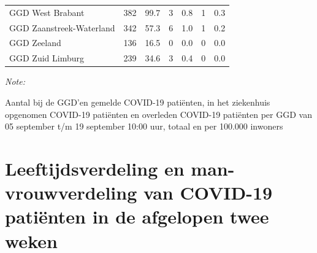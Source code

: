 \documentclass[
  english,
  man,floatsintext]{apa6}
\begin{document}
\begin{table}[H]
\begin{threeparttable}
\begin{tabular}{lrrrrrr}
GGD West Brabant & 382 & 99.7 & 3 & 0.8 & 1 & 0.3\\
GGD Zaanstreek-Waterland & 342 & 57.3 & 6 & 1.0 & 1 & 0.2\\
GGD Zeeland & 136 & 16.5 & 0 & 0.0 & 0 & 0.0\\
GGD Zuid Limburg & 239 & 34.6 & 3 & 0.4 & 0 & 0.0\\
\bottomrule
\end{tabular}
\begin{tablenotes}
\item \textit{Note: } 
\item Aantal bij de GGD’en gemelde COVID-19 patiënten, in het ziekenhuis opgenomen COVID-19 patiënten en overleden COVID-19 patiënten per GGD van 05 september t/m 19 september 10:00 uur, totaal en per 100.000 inwoners
\end{tablenotes}
\end{threeparttable}
\endgroup{}
\end{table}

\newpage

\hypertarget{leeftijdsverdeling-en-man-vrouwverdeling-van-covid-19-patiuxebnten-in-de-afgelopen-twee-weken}{%
\section{Leeftijdsverdeling en man-vrouwverdeling van COVID-19 patiënten in de afgelopen twee weken}\label{leeftijdsverdeling-en-man-vrouwverdeling-van-covid-19-patiuxebnten-in-de-afgelopen-twee-weken}}
\end{document}
